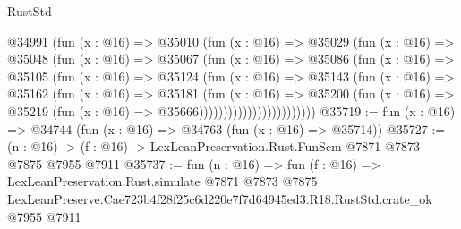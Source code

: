 \begin{lexlean}{RustStd}
\begin{coremodule}
                        @34991
                          (fun (x : @16) =>
                          @35010
                            (fun (x : @16) =>
                            @35029
                              (fun (x : @16) =>
                              @35048
                                (fun (x : @16) =>
                                @35067
                                  (fun (x : @16) =>
                                  @35086
                                    (fun (x : @16) =>
                                    @35105
                                      (fun (x : @16) =>
                                      @35124
                                        (fun (x : @16) =>
                                        @35143
                                          (fun (x : @16) =>
                                          @35162
                                            (fun (x : @16) =>
                                            @35181
                                              (fun (x : @16) =>
                                              @35200
                                                (fun (x : @16) =>
                                                @35219
                                                  (fun (x : @16) => @35666))))))))))))))))))))))))
@35719 := fun (x : @16) => @34744 (fun (x : @16) => @34763 (fun (x : @16) => @35714))
@35727 := (n : @16) -> (f : @16) -> LexLeanPreservation.Rust.FunSem @7871 @7873 @7875 @7955 @7911
@35737 := fun (n : @16) =>
  fun (f : @16) =>
  LexLeanPreservation.Rust.simulate
    @7871
    @7873
    @7875
    LexLeanPreserve.Cae723b4f28f25c6d220e7f7d64945ed3.R18.RustStd.crate_ok
    @7955
    @7911
\end{coremodule}
\end{lexlean}
